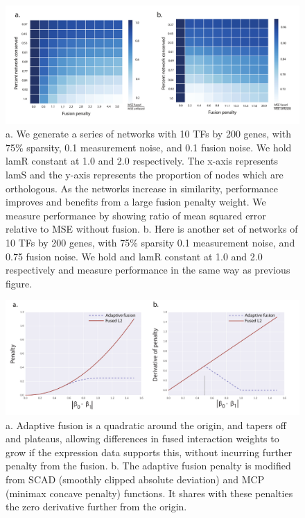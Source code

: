 \documentclass[11pt]{article}
\begin{document}
\begin{figure}
\begin{center}
  \includegraphics[scale=0.45]{fig2.pdf}
  \caption{\label{syntheticgrid} a. We generate a series of networks with 10 TFs by 200 genes, with 75\% sparsity, 0.1 measurement noise, and 0.1 fusion noise. We hold lamR constant at 1.0 and 2.0 respectively. The x-axis represents lamS and the y-axis represents the proportion of nodes which are orthologous. As the networks increase in similarity, performance improves and benefits from a large fusion penalty weight. We measure performance by showing ratio of mean squared error relative to MSE without fusion. b. Here is another set of networks of 10 TFs by 200 genes, with 75\% sparsity 0.1 measurement noise, and 0.75 fusion noise. We hold and lamR constant at 1.0 and 2.0 respectively and measure performance in the same way as previous figure.}
\end{center}
\end{figure}

\begin{figure}
\begin{center}
  \includegraphics[scale=0.45]{fig3.pdf}
  \caption{\label{adapt-schematic} a. Adaptive fusion is a quadratic around the origin, and tapers off and plateaus, allowing differences in fused interaction weights to grow if the expression data supports this, without incurring further penalty from the fusion. b. The adaptive fusion penalty is modified from SCAD (smoothly clipped absolute deviation) and MCP (minimax concave penalty) functions. It shares with these penalties the zero derivative further from the origin. }
\end{center}
\end{figure}
\end{document}
